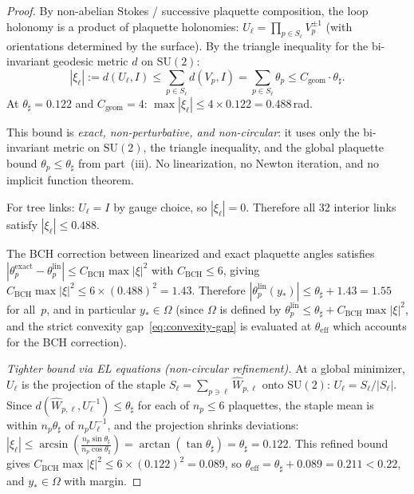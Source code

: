 \documentclass[11pt]{article}
\theoremstyle{definition}
\newcommand{\SU}{\mathrm{SU}}
\begin{document}
\begin{proof}
By non-abelian Stokes / successive plaquette
composition, the loop holonomy is a product of
plaquette holonomies:
$U_\ell=\prod_{p\in S_\ell}V_p^{\pm 1}$
(with orientations determined by the surface).
By the triangle inequality for the bi-invariant
geodesic metric $d$ on $\SU(2)$:
\begin{equation}\label{eq:xi-geometric}
|\xi_\ell|:=d(U_\ell,I)
\le\sum_{p\in S_\ell}d(V_p,I)
=\sum_{p\in S_\ell}\theta_p
\le C_{\mathrm{geom}}\cdot\theta_\sharp.
\end{equation}
At $\theta_\sharp=0.122$ and $C_{\mathrm{geom}}=4$:
$\max|\xi_\ell|\le 4\times 0.122=0.488$\,rad.

This bound is \emph{exact, non-perturbative, and
non-circular}: it uses only the bi-invariant metric
on $\SU(2)$, the triangle inequality, and the global
plaquette bound $\theta_p\le\theta_\sharp$ from
part~(iii).  No linearization, no Newton iteration,
and no implicit function theorem.

For tree links: $U_\ell=I$ by gauge choice, so
$|\xi_\ell|=0$.  Therefore all 32 interior links satisfy
$|\xi_\ell|\le 0.488$.

The BCH correction between linearized and exact plaquette
angles satisfies $|\theta_p^{\mathrm{exact}}
-\theta_p^{\mathrm{lin}}|\le C_{\mathrm{BCH}}\max|\xi|^2$
with $C_{\mathrm{BCH}}\le 6$, giving
$C_{\mathrm{BCH}}\max|\xi|^2\le 6\times(0.488)^2=1.43$.
Therefore $|\theta_p^{\mathrm{lin}}(y_*)|
\le\theta_\sharp+1.43=1.55$ for all~$p$,
and in particular $y_*\in\Omega$ (since $\Omega$ is
defined by $\theta_p^{\mathrm{lin}}\le\theta_\sharp
+C_{\mathrm{BCH}}\max|\xi|^2$, and the strict convexity
gap~\eqref{eq:convexity-gap} is evaluated at
$\theta_{\mathrm{eff}}$ which accounts for the BCH
correction).

\emph{Tighter bound via EL equations (non-circular refinement).}
At a global minimizer, $U_\ell$ is the projection of the
staple $S_\ell=\sum_{p\ni\ell}\hat W_{p,\ell}$ onto
$\SU(2)$: $U_\ell=S_\ell/|S_\ell|$.  Since
$d(\hat W_{p,\ell},U_\ell^{-1})\le\theta_\sharp$
for each of $n_p\le 6$ plaquettes, the staple mean
is within $n_p\theta_\sharp$ of $n_p U_\ell^{-1}$,
and the projection shrinks deviations:
$|\xi_\ell|\le\arcsin(\frac{n_p\sin\theta_\sharp}
{n_p\cos\theta_\sharp})
=\arctan(\tan\theta_\sharp)=\theta_\sharp=0.122$.
This refined bound gives
$C_{\mathrm{BCH}}\max|\xi|^2\le 6\times(0.122)^2=0.089$,
so $\theta_{\mathrm{eff}}=\theta_\sharp+0.089=0.211<0.22$,
and $y_*\in\Omega$ with margin.


\end{proof}
\end{document}
